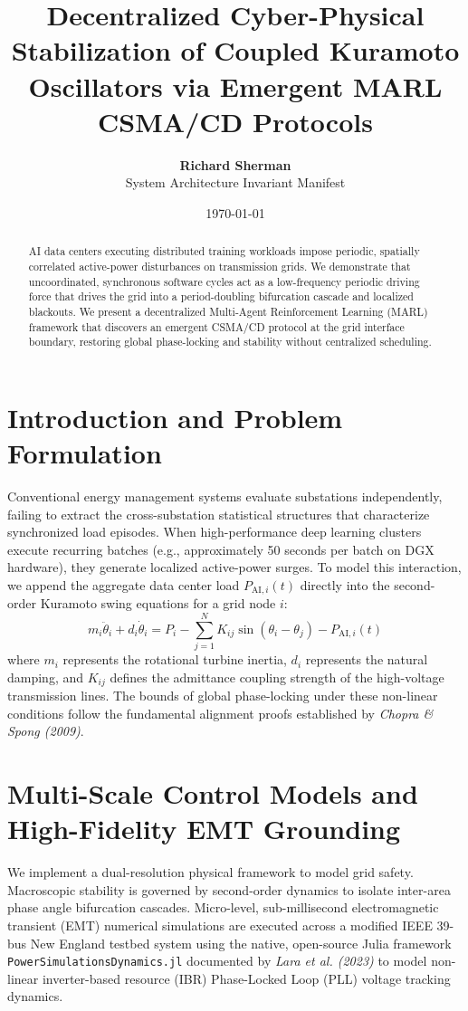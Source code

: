 \documentclass[11pt,fleqn]{article}
\title{\textbf{Decentralized Cyber-Physical Stabilization of Coupled Kuramoto Oscillators via Emergent MARL CSMA/CD Protocols}}
\author{\textbf{Richard Sherman} \\ System Architecture Invariant Manifest}
\date{\today}
\begin{document}
\maketitle

\begin{abstract}
AI data centers executing distributed training workloads impose periodic, spatially correlated active-power disturbances on transmission grids. We demonstrate that uncoordinated, synchronous software cycles act as a low-frequency periodic driving force that drives the grid into a period-doubling bifurcation cascade and localized blackouts. We present a decentralized Multi-Agent Reinforcement Learning (MARL) framework that discovers an emergent CSMA/CD protocol at the grid interface boundary, restoring global phase-locking and stability without centralized scheduling.
\end{abstract}

\section{Introduction and Problem Formulation}
Conventional energy management systems evaluate substations independently, failing to extract the cross-substation statistical structures that characterize synchronized load episodes. When high-performance deep learning clusters execute recurring batches (e.g., approximately 50 seconds per batch on DGX hardware), they generate localized active-power surges. To model this interaction, we append the aggregate data center load $P_{\text{AI}, i}(t)$ directly into the second-order Kuramoto swing equations for a grid node $i$:
\begin{equation}
m_i \ddot{\theta}_i + d_i \dot{\theta}_i = P_i - \sum_{j=1}^{N} K_{ij} \sin(\theta_i - \theta_j) - P_{\text{AI}, i}(t)
\end{equation}
where $m_i$ represents the rotational turbine inertia, $d_i$ represents the natural damping, and $K_{ij}$ defines the admittance coupling strength of the high-voltage transmission lines. The bounds of global phase-locking under these non-linear conditions follow the fundamental alignment proofs established by \textit{Chopra \& Spong (2009)}.

\section{Multi-Scale Control Models and High-Fidelity EMT Grounding}
We implement a dual-resolution physical framework to model grid safety. Macroscopic stability is governed by second-order dynamics to isolate inter-area phase angle bifurcation cascades. Micro-level, sub-millisecond electromagnetic transient (EMT) numerical simulations are executed across a modified IEEE 39-bus New England testbed system using the native, open-source Julia framework \texttt{PowerSimulationsDynamics.jl} documented by \textit{Lara et al. (2023)} to model non-linear inverter-based resource (IBR) Phase-Locked Loop (PLL) voltage tracking dynamics. 
\end{document}
